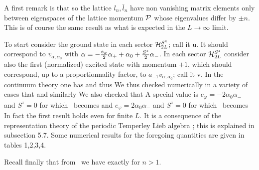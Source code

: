A first remark is that
%
\eqn{}
%
so the lattice $l_n,\bar{l}_n$ have non vanishing matrix elements only between
eigenspaces of the lattice momentum ${\cal P}$ whose eigenvalues differ
 by $\pm n$. This
is of course the same result as what is expected in the $L\rightarrow\infty$
limit.


To start consider the ground state in each sector ${\cal H}_{2L}^{S^z}$; call
 it u.
 It should
correspond to $v_{\alpha,\alpha_0}$ with $\alpha=-{e_\varphi\over 2}\alpha_++
\alpha_0+
{S^z\over 2}\alpha_-$.
In each sector  ${\cal H}_{2L}^{S^z}$ consider also the first (normalized)
excited state with momentum $+1$, which should correspond, up to a
proportionnality
 factor, to $a_{-1}v_{\alpha,\alpha_0}$; call it v. In the
continuum theory one has
%
\eqn{}
%
and thus
%
\eqn{}
%
We thus checked numerically in a variety of cases that
%
\eqn{}
%
and similarly
%
\eqn{}
%
We also checked that
%
\eqn{}
%
A special value is $e_\varphi=-2\alpha_0\alpha_-$ and $S^z=0$
 for which \nri\ becomes
%
\eqn{}
%
and $e_\varphi=2\alpha_0\alpha_-$ and $S^z=0$ for which \nrii\ becomes
%
\eqn{}
%
In fact the first result holds even for finite $L$. It is a consequence of the
representation theory of the periodic Temperley Lieb algebra \MS; this is
explained in subsection 5.7. Some numerical results for the foregoing
quantities are given in tables 1,2,3,4.


Recall finally that  from \momcom\  we have exactly
%
\eqn{}
%
for  $n>1$.




